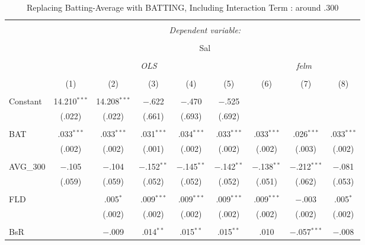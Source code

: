 
\begin{table}[H] \centering 
  \caption{Replacing Batting-Average with BATTING, Including Interaction Term
          : around .300} 
  \label{AVG300_C} 
\tiny 
\begin{tabular}{@{\extracolsep{5pt}}lcccccccc} 
\\[-1.8ex]\hline 
\hline \\[-1.8ex] 
 & \multicolumn{8}{c}{\textit{Dependent variable:}} \\ 
\cline{2-9} 
\\[-1.8ex] & \multicolumn{8}{c}{Sal} \\ 
\\[-1.8ex] & \multicolumn{5}{c}{\textit{OLS}} & \multicolumn{3}{c}{\textit{felm}} \\ 
\\[-1.8ex] & (1) & (2) & (3) & (4) & (5) & (6) & (7) & (8)\\ 
\hline \\[-1.8ex] 
 Constant & 14.210$^{***}$ & 14.208$^{***}$ & $-$.622 & $-$.470 & $-$.525 &  &  &  \\ 
  & (.022) & (.022) & (.661) & (.693) & (.692) &  &  &  \\ 
  & & & & & & & & \\ 
 BAT & .033$^{***}$ & .033$^{***}$ & .031$^{***}$ & .034$^{***}$ & .033$^{***}$ & .033$^{***}$ & .026$^{***}$ & .033$^{***}$ \\ 
  & (.002) & (.002) & (.001) & (.002) & (.002) & (.002) & (.003) & (.002) \\ 
  & & & & & & & & \\ 
 AVG\_300 & $-$.105 & $-$.104 & $-$.152$^{**}$ & $-$.145$^{**}$ & $-$.142$^{**}$ & $-$.138$^{**}$ & $-$.212$^{***}$ & $-$.081 \\ 
  & (.059) & (.059) & (.052) & (.052) & (.052) & (.051) & (.062) & (.053) \\ 
  & & & & & & & & \\ 
 FLD &  & .005$^{*}$ & .009$^{***}$ & .009$^{***}$ & .009$^{***}$ & .009$^{***}$ & $-$.003 & .005$^{*}$ \\ 
  &  & (.002) & (.002) & (.002) & (.002) & (.002) & (.002) & (.002) \\ 
  & & & & & & & & \\ 
 BsR &  & $-$.009 & .014$^{**}$ & .015$^{**}$ & .015$^{**}$ & .010 & $-$.057$^{***}$ & $-$.008 \\ 

\end{tabular}
\end{table}
